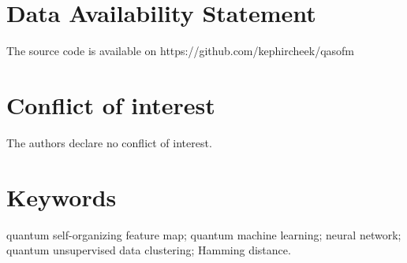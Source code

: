 \documentclass[pra,showkeys,twocolumn,showpacs,aps,10pt]{revtex4-1}
\begin{document}


\section*{Data Availability Statement}

The source code is available on https://github.com/kephircheek/qasofm 



\section*{Conflict of interest}

The authors declare no conflict of interest.


\section*{Keywords}
quantum self-organizing feature map; quantum machine learning; neural network; quantum unsupervised data clustering; Hamming distance.



\end{document}
